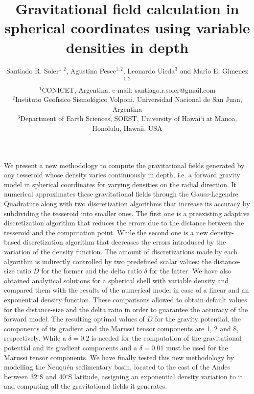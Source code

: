 \documentclass[extra]{gji}
\begin{document}
\title[Variable Density Tesseroids]{
    Gravitational field calculation in spherical coordinates using variable
    densities in depth
}
\author[S.R. Soler, A. Pesce, L. Uieda and M.E. Gimenez]{
    Santiado R. Soler$^{1,2}$, Agustina Pesce$^{1,2}$, Leonardo Uieda$^3$ and
    Mario E. Gimenez$^{1,2}$ \\
    $^1$CONICET, Argentina. e-mail: santiago.r.soler@gmail.com\\
    $^2$Instituto Geofísico Sismológico Volponi, Universidad Nacional de
    San Juan, Argentina\\
    $^3$Department of Earth Sciences, SOEST, University of Hawai‘i at
    M\={a}noa, Honolulu, Hawaii, USA
}


\maketitle

\begin{summary}
We present a new methodology to compute the gravitational fields generated by
any tesseroid whose density varies continuously in depth, i.e. a forward
gravity model in spherical coordinates for varying densities on the radial
direction.
It numerical approximates these gravitational fields through the
Gauss-Legendre Quadrature along with two discretization algorithms that
increase its accuracy by subdividing the tesseroid into smaller ones.
The first one is a preexisting adaptive discretization algorithm that reduces
the errors due to the distance between the tesseroid and the computation
point.
While the second one  is a new density-based discretization algorithm that
decreases the errors introduced by the variation of the density function.
The amount of discretizations made by each algorithm is indirectly controlled
by two predefined scalar values: the distance-size ratio $D$ for the former
and the delta ratio $\delta$ for the latter.
We have also obtained analytical solutions for a spherical shell with variable
density and compared them with the results of the numerical model in case of a
linear and an exponential density function.
These comparisons allowed to obtain default values for the distance-size and
the delta ratio in order to guarantee the accuracy of the forward model.
The resulting optimal values of $D$ for the gravity potential, the components
of its gradient and the Marussi tensor components are 1, 2 and 8,
respectively.
While a $\delta=0.2$ is needed for the computation of the gravitational
potential and its gradient components and a $\delta=0.01$ must be used for
the Marussi tensor components.
We have finally tested this new methodology by modelling the Neuqu\'en
sedimentary basin, located to the east of the Andes between 32$^\circ$S and
40$^\circ$S latitude, assigning an exponential density variation to it and
computing all the gravitational fields it generates.
\end{summary}
\end{document}
